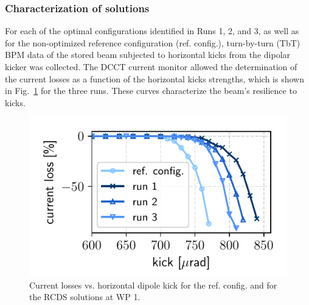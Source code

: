 \subsubsection{Characterization of solutions}
For each of the optimal configurations identified in Runs 1, 2, and 3, as well as for the non-optimized reference configuration (ref. config.), turn-by-turn (TbT) BPM data of the stored beam subjected to horizontal kicks from the dipolar kicker was collected. The DCCT current monitor allowed the determination of the current losses as a function of the horizontal kicks strengths, which is shown in Fig.~\ref{fig:loss_kicks} for the three runs. These curves characterize the beam's resilience to kicks.
\begin{figure}[tb]
    \centering
    \includegraphics[width=0.6\columnwidth]{Images/WEPL087_f1.pdf}
    \caption[Current losses vs. horizontal dipole kick for the ref. config. and for the RCDS solutions at WP 1.]{Current losses vs. horizontal dipole kick for the ref. config. and for the RCDS solutions at WP 1.}
       \label{fig:loss_kicks}
\end{figure}

